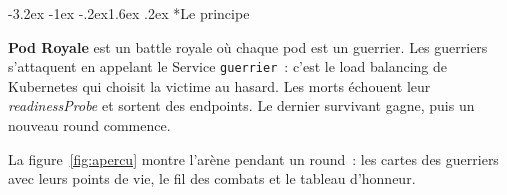 \documentclass[11pt,a4paper]{article}
\makeatletter
\newcommand{\titlefont}{\sffamily\bfseries}
\renewcommand\section{\@startsection{section}{1}{\z@}%
  {-3.2ex \@plus -1ex \@minus -.2ex}{1.6ex \@plus .2ex}%
  {\titlefont\Large\color{nuit}}}
\newcommand{\code}[1]{\texttt{#1}}
\makeatother
\begin{document}
\tableofcontents
\vspace{1.5em}

\section*{Le principe}

\textbf{Pod Royale} est un battle royale où chaque pod est un guerrier.
Les guerriers s'attaquent en appelant le Service \code{guerrier}~: c'est le
load balancing de Kubernetes qui choisit la victime au hasard. Les morts
échouent leur \emph{readinessProbe} et sortent des endpoints. Le dernier
survivant gagne, puis un nouveau round commence.

La figure~\ref{fig:apercu} montre l'arène pendant un round~: les cartes des
guerriers avec leurs points de vie, le fil des combats et le tableau d'honneur.
\end{document}
